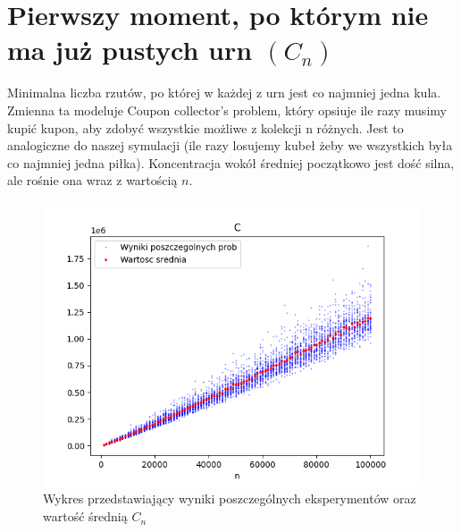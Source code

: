 \documentclass{report}
\begin{document}
\section*{Pierwszy moment, po którym nie ma już pustych urn \((C_n)\)}
\justifying
Minimalna liczba rzutów, po której w każdej z urn jest co najmniej jedna kula.
Zmienna ta modeluje Coupon collector's problem, który opsiuje ile razy musimy kupić
kupon, aby zdobyć wszystkie możliwe z kolekcji n różnych. Jest to analogiczne do naszej
symulacji (ile razy losujemy kubeł żeby we wszystkich była co najmniej jedna piłka).
Koncentracja wokół średniej początkowo jest dość silna, ale rośnie ona wraz z wartością
\(n\).
    \begin{figure}[htp]
        \centering
        \includegraphics[scale=0.7]{plotC.png}
        \caption[Example .]{Wykres przedstawiający wyniki poszczególnych eksperymentów oraz wartość średnią \(C_{n}\)}
        \label{plotC}
    \end{figure}
\end{document}
